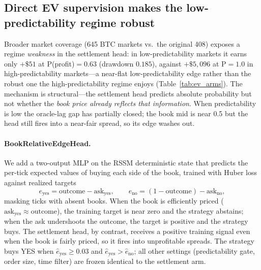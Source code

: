 \documentclass{article}
\begin{document}
\subsection{Direct EV supervision makes the low-predictability regime robust}\label{sec:results_ev}

Broader market coverage (645 BTC markets vs.\ the original 408) exposes a
regime \emph{weakness} in the settlement head: in low-predictability markets
it earns only $+\$51$ at P(profit)$=0.63$ (drawdown $0.185$), against
$+\$5{,}096$ at P$=1.0$ in high-predictability markets---a near-flat
low-predictability edge rather than the robust one the high-predictability
regime enjoys (Table~\ref{tab:ev_arms}).  The mechanism is structural---the
settlement head predicts absolute probability but not whether the \emph{book
price already reflects that information}.  When predictability is low the
oracle-lag gap has partially closed; the book mid is near 0.5 but the head
still fires into a near-fair spread, so its edge washes out.

\paragraph{BookRelativeEdgeHead.}
We add a two-output MLP on the RSSM deterministic state that predicts
the per-tick expected values of buying each side of the book, trained
with Huber loss against realized targets
\[
e_\text{yes} = \text{outcome} - \text{ask}_\text{yes}, \qquad
e_\text{no}  = (1-\text{outcome}) - \text{ask}_\text{no},
\]
masking ticks with absent books.  When the book is efficiently priced
($\text{ask}_\text{yes} \approx \text{outcome}$), the training target is
near zero and the strategy abstains; when the ask undershoots the
outcome, the target is positive and the strategy buys.  The settlement
head, by contrast, receives a positive training signal even when the
book is fairly priced, so it fires into unprofitable spreads.  The strategy buys YES when $\hat{e}_\text{yes} \geq 0.03$
and $\hat{e}_\text{yes} > \hat{e}_\text{no}$; all other settings
(predictability gate, order size, time filter) are frozen identical to
the settlement arm.
\end{document}
